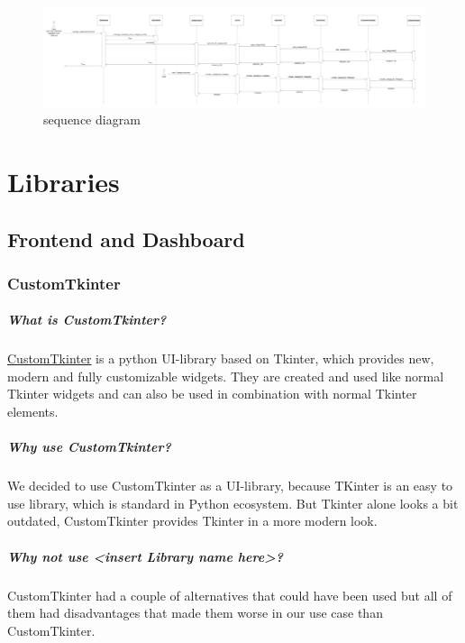 \documentclass[parskip=full]{report} %
\begin{document}
\begin{figure}
\centering
\includegraphics[width=1\textwidth]
        {pictures/sequenzdiagramm.png}
  \caption{sequence diagram}
  \label{fig:sequencediagram}
\end{figure}


\chapter{Libraries}

\section{Frontend and Dashboard}

\subsection{CustomTkinter}

\paragraph{What is CustomTkinter?}
\href{https://github.com/TomSchimansky/CustomTkinter}{CustomTkinter} is a python UI-library based on Tkinter, which provides new, modern and fully customizable widgets. They are created and used like normal Tkinter widgets and can also be used in combination with normal Tkinter elements. 

\paragraph{Why use CustomTkinter?}
We decided to use CustomTkinter as a UI-library, because TKinter is an easy to use library, which is standard in Python ecosystem.
But Tkinter alone looks a bit outdated, CustomTkinter provides Tkinter in a more modern look.

\paragraph{Why not use <insert Library name here>?}
CustomTkinter had a couple of alternatives that could have been used but all of them had disadvantages that made them worse in our use case than CustomTkinter. 
  
\end{document}
